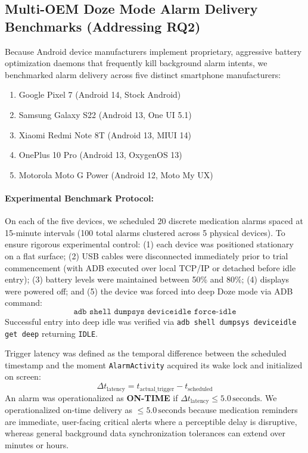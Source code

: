\documentclass[11pt,a4paper]{article}
\begin{document}
\subsection{Multi-OEM Doze Mode Alarm Delivery Benchmarks (Addressing RQ2)}
\label{sec:oem_benchmarks}

Because Android device manufacturers implement proprietary, aggressive battery optimization daemons that frequently kill background alarm intents, we benchmarked alarm delivery across five distinct smartphone manufacturers:
\begin{enumerate}
    \item Google Pixel 7 (Android 14, Stock Android)
    \item Samsung Galaxy S22 (Android 13, One UI 5.1)
    \item Xiaomi Redmi Note 8T (Android 13, MIUI 14)
    \item OnePlus 10 Pro (Android 13, OxygenOS 13)
    \item Motorola Moto G Power (Android 12, Moto My UX)
\end{enumerate}

\paragraph{Experimental Benchmark Protocol:}
On each of the five devices, we scheduled 20 discrete medication alarms spaced at 15-minute intervals (100 total alarms clustered across 5 physical devices). To ensure rigorous experimental control: (1) each device was positioned stationary on a flat surface; (2) USB cables were disconnected immediately prior to trial commencement (with ADB executed over local TCP/IP or detached before idle entry); (3) battery levels were maintained between 50\% and 80\%; (4) displays were powered off; and (5) the device was forced into deep Doze mode via ADB command:
\begin{equation*}
    \texttt{adb shell dumpsys deviceidle force-idle}
\end{equation*}
Successful entry into deep idle was verified via \texttt{adb shell dumpsys deviceidle get deep} returning \texttt{IDLE}.

Trigger latency was defined as the temporal difference between the scheduled timestamp and the moment \texttt{AlarmActivity} acquired its wake lock and initialized on screen:
\begin{equation}
    \Delta t_{\text{latency}} = t_{\text{actual\_trigger}} - t_{\text{scheduled}}
\end{equation}
An alarm was operationalized as \textbf{ON-TIME} if $\Delta t_{\text{latency}} \le 5.0\,\text{seconds}$. We operationalized on-time delivery as $\le 5.0\,\text{seconds}$ because medication reminders are immediate, user-facing critical alerts where a perceptible delay is disruptive, whereas general background data synchronization tolerances can extend over minutes or hours.
\end{document}
